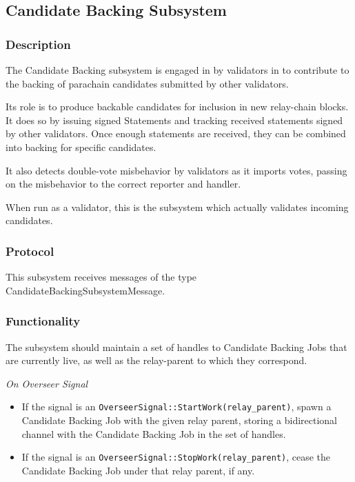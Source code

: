 \subsection{Candidate Backing Subsystem}

\subsubsection{Description}

The Candidate Backing subsystem is engaged in by validators in to contribute to
the backing of parachain candidates submitted by other validators.
\newline

Its role is to produce backable candidates for inclusion in new relay-chain
blocks. It does so by issuing signed Statements and tracking received statements
signed by other validators. Once enough statements are received, they can be
combined into backing for specific candidates.
\newline

It also detects double-vote misbehavior by validators as it imports votes,
passing on the misbehavior to the correct reporter and handler.
\newline

When run as a validator, this is the subsystem which actually validates incoming
candidates.

\subsubsection{Protocol}

This subsystem receives messages of the type CandidateBackingSubsystemMessage.

\subsubsection{Functionality}

The subsystem should maintain a set of handles to Candidate Backing Jobs that
are currently live, as well as the relay-parent to which they correspond.
\newline

\textit{On Overseer Signal}

\begin{itemize}
    \item If the signal is an \verb|OverseerSignal::StartWork(relay_parent)|,
    spawn a Candidate Backing Job with the given relay parent, storing a
    bidirectional channel with the Candidate Backing Job in the set of handles.
    \item If the signal is an \verb|OverseerSignal::StopWork(relay_parent)|,
    cease the Candidate Backing Job under that relay parent, if any.
\end{itemize}

